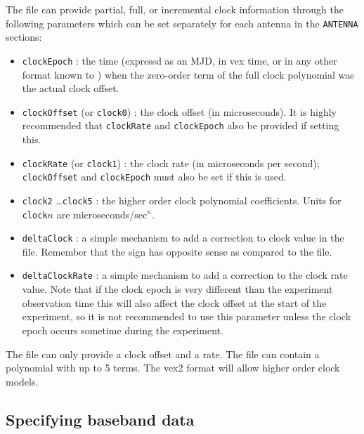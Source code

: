 \documentclass[12pt]{article}
\begin{document}
The \vd file can provide partial, full, or incremental clock information through the following parameters which can be set separately for each antenna in the {\tt ANTENNA} sections:
\begin{itemize}
\item {\tt clockEpoch} : the time (expressd as an MJD, in vex time, or in any other format known to \vexdifx) when the zero-order term of the full clock polynomial was the actual clock offset.
\item {\tt clockOffset} (or {\tt clock0}) : the clock offset (in microseconds).  It is highly recommended that {\tt clockRate} and {\tt clockEpoch} also be provided if setting this.
\item {\tt clockRate} (or {\tt clock1}) : the clock rate (in microseconds per second); {\tt clockOffset} and {\tt clockEpoch} must also be set if this is used.
\item {\tt clock2} \ldots {\tt clock5} : the higher order clock polynomial coefficients.  Units for {\tt clock}$n$ are microseconds/sec$^n$.
\item {\tt deltaClock} : a simple mechanism to add a correction to clock value in the \vx file.  Remember that the sign has opposite sense as compared to the \vx file.
\item {\tt deltaClockRate} : a simple mechanism to add a correction to the clock rate value.  Note that if the clock epoch is very different than the experiment observation time this will also affect the clock offset at the start of the experiment, so it is not recommended to use this parameter unless the clock epoch occurs sometime during the experiment.
\end{itemize}
The \vx file can only provide a clock offset and a rate.
The \vd file can contain a polynomial with up to 5 terms.
The vex2 format will allow higher order clock models.






\subsection{Specifying baseband data} \label{sec:data}
\end{document}
